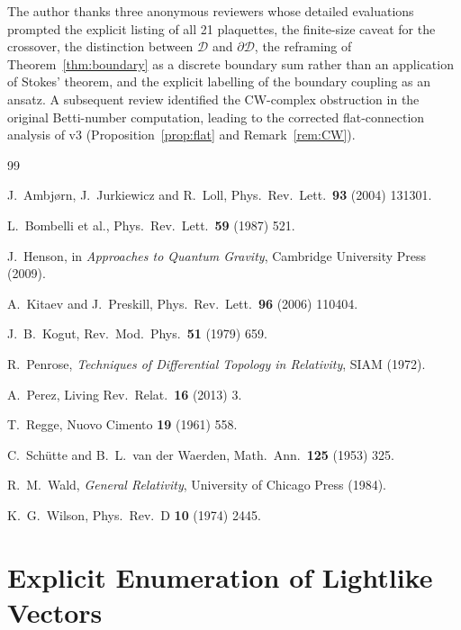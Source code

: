 \documentclass[12pt, a4paper]{article}
\theoremstyle{plain}
\theoremstyle{definition}
\theoremstyle{remark}
\newcommand{\CD}{\mathscr{D}}
\newcommand{\BdyCD}{\partial\mathscr{D}}
\begin{document}
The author thanks three anonymous reviewers whose detailed
evaluations prompted the explicit listing of all 21 plaquettes,
the finite-size caveat for the crossover, the distinction between
$\CD$ and $\BdyCD$, the reframing of Theorem~\ref{thm:boundary}
as a discrete boundary sum rather than an application of Stokes'
theorem, and the explicit labelling of the boundary coupling as
an ansatz.
A subsequent review identified the CW-complex obstruction in the
original Betti-number computation, leading to the corrected
flat-connection analysis of v3 (Proposition~\ref{prop:flat} and
Remark~\ref{rem:CW}).

\begin{thebibliography}{99}

J.~Ambj\o{}rn, J.~Jurkiewicz and R.~Loll,
Phys.\ Rev.\ Lett.\ \textbf{93} (2004) 131301.

L.~Bombelli et al.,
Phys.\ Rev.\ Lett.\ \textbf{59} (1987) 521.

J.~Henson, in \emph{Approaches to Quantum Gravity},
Cambridge University Press (2009).

A.~Kitaev and J.~Preskill,
Phys.\ Rev.\ Lett.\ \textbf{96} (2006) 110404.

J.~B.~Kogut, Rev.\ Mod.\ Phys.\ \textbf{51} (1979) 659.

R.~Penrose, \emph{Techniques of Differential Topology in
Relativity}, SIAM (1972).

A.~Perez, Living Rev.\ Relat.\ \textbf{16} (2013) 3.

T.~Regge, Nuovo Cimento \textbf{19} (1961) 558.

C.~Sch{\"u}tte and B.~L.~van der Waerden,
Math.\ Ann.\ \textbf{125} (1953) 325.

R.~M.~Wald, \emph{General Relativity},
University of Chicago Press (1984).

K.~G.~Wilson, Phys.\ Rev.\ D \textbf{10} (1974) 2445.

\end{thebibliography}

\appendix

\section{Explicit Enumeration of Lightlike Vectors}\label{app:enum}
\end{document}
